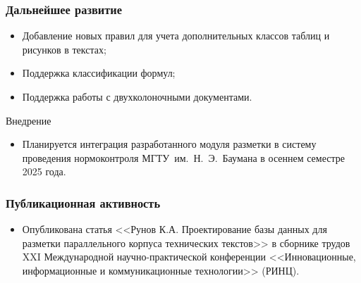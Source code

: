\documentclass[gray]{beamer}
\begin{document}
\begin{frame}
    \frametitle{Дальнейшее развитие}
    \begin{itemize}
        \item Добавление новых правил для учета дополнительных классов таблиц и рисунков в текстах;
        \item Поддержка классификации формул;
        \item Поддержка работы с двухколоночными документами.
    \end{itemize}

    \vfill

    \begin{center}
        \large Внедрение
    \end{center}

    \begin{itemize}
        \item Планируется интеграция разработанного модуля разметки в систему проведения нормоконтроля МГТУ~им.~Н.~Э.~Баумана в осеннем семестре 2025 года.
    \end{itemize}

\end{frame}

\begin{frame}
    \frametitle{Публикационная активность}
    
    \begin{itemize}
        \item Опубликована статья <<Рунов К.А. Проектирование базы данных для разметки параллельного корпуса технических текстов>> в сборнике трудов XXI Международной научно-практической конференции <<Инновационные, информационные и коммуникационные технологии>> (РИНЦ).
    \end{itemize}
\end{frame}
\end{document}
